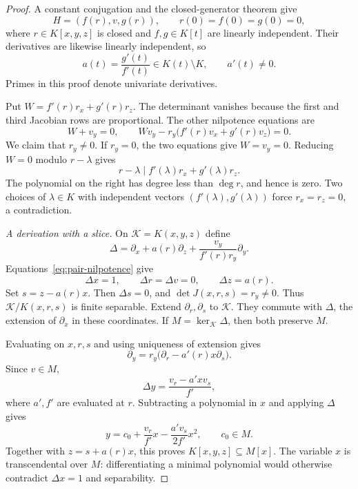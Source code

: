 \documentclass[11pt,reqno]{amsart}
\theoremstyle{definition}
\theoremstyle{remark}
\numberwithin{equation}{section}
\begin{document}
\begin{proof}
A constant conjugation and the closed-generator theorem give
\begin{equation}\label{eq:pair-form}
 H=(f(r),v,g(r)),\qquad r(0)=f(0)=g(0)=0,
\end{equation}
where $r\in K[x,y,z]$ is closed and $f,g\in K[t]$ are linearly independent. Their derivatives are likewise linearly independent, so
\begin{equation}\label{eq:a-ratio}
 a(t)=\frac{g'(t)}{f'(t)}\in K(t)\setminus K,\qquad a'(t)\neq0.
\end{equation}
Primes in this proof denote univariate derivatives.

Put $W=f'(r)r_x+g'(r)r_z$. The determinant vanishes because the first and third Jacobian rows are proportional. The other nilpotence equations are
\begin{equation}\label{eq:pair-nilpotence}
 W+v_y=0,\qquad Wv_y-r_y\bigl(f'(r)v_x+g'(r)v_z\bigr)=0.
\end{equation}
We claim that $r_y\neq0$. If $r_y=0$, the two equations give $W=v_y=0$. Reducing $W=0$ modulo $r-\lambda$ gives
\[
 r-\lambda\mid f'(\lambda)r_x+g'(\lambda)r_z.
\]
The polynomial on the right has degree less than $\deg r$, and hence is zero. Two choices of $\lambda\in K$ with independent vectors $(f'(\lambda),g'(\lambda))$ force $r_x=r_z=0$, a contradiction.

\smallskip\noindent\emph{A derivation with a slice.}
On $\mathcal K=K(x,y,z)$ define
\begin{equation}\label{eq:delta}
 \Delta=\partial_x+a(r)\partial_z+\frac{v_y}{f'(r)r_y}\partial_y.
\end{equation}
Equations~\eqref{eq:pair-nilpotence} give
\[
 \Delta x=1,\qquad \Delta r=\Delta v=0,\qquad \Delta z=a(r).
\]
Set $s=z-a(r)x$. Then $\Delta s=0$, and $\det J(x,r,s)=r_y\neq0$. Thus $\mathcal K/K(x,r,s)$ is finite separable. Extend $\partial_r,\partial_s$ to $\mathcal K$. They commute with $\Delta$, the extension of $\partial_x$ in these coordinates. If $M=\ker_{\mathcal K}\Delta$, then both preserve $M$.

Evaluating on $x,r,s$ and using uniqueness of extension gives
\begin{equation}\label{eq:dy-identity}
 \partial_y=r_y\bigl(\partial_r-a'(r)x\partial_s\bigr).
\end{equation}
Since $v\in M$,
\[
 \Delta y=\frac{v_r-a'xv_s}{f'},
\]
where $a',f'$ are evaluated at $r$. Subtracting a polynomial in $x$ and applying $\Delta$ gives
\begin{equation}\label{eq:y-polynomial}
 y=c_0+\frac{v_r}{f'}x-\frac{a'v_s}{2f'}x^2,\qquad c_0\in M.
\end{equation}
Together with $z=s+a(r)x$, this proves $K[x,y,z]\subseteq M[x]$. The variable $x$ is transcendental over $M$: differentiating a minimal polynomial would otherwise contradict $\Delta x=1$ and separability.


\end{proof}
\end{document}
